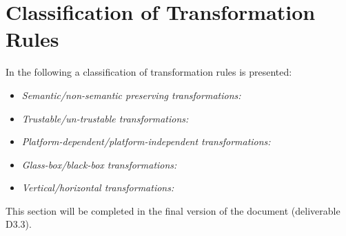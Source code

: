 
\section{Classification of Transformation Rules}
\label{sec:classification}

In the following a classification of transformation rules is presented:
\begin{itemize}
    \item \textit{Semantic/non-semantic preserving transformations:}
    \item \textit{Trustable/un-trustable transformations:} 
    \item \textit{Platform-dependent/platform-independent transformations:}
    \item \textit{Glass-box/black-box transformations:}
    \item \textit{Vertical/horizontal transformations:}
\end{itemize}

This section will be completed in the final version of the document (deliverable
D3.3).

